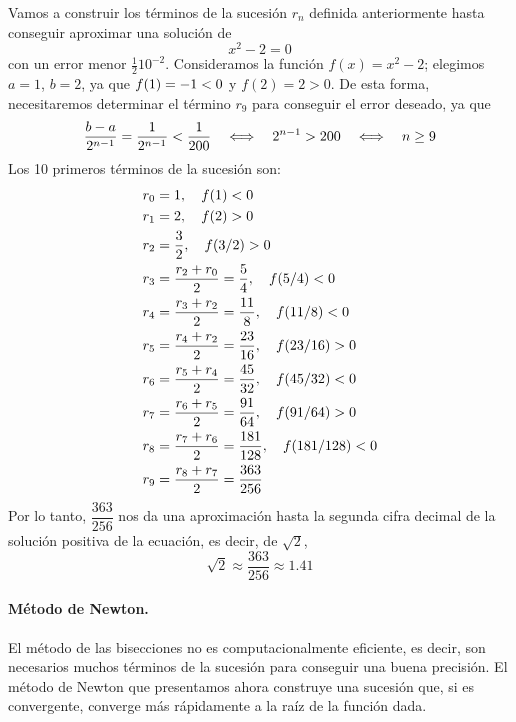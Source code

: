 \begin{ejemplo}
Vamos a construir los términos de la sucesión $r_n$ definida anteriormente hasta conseguir aproximar una solución de
\[
x^2-2=0
\]
con un error menor $\frac1210^{-2}$.
Consideramos la función $f(x)=x^2-2$; elegimos $a=1$, $b=2$, ya que $f(1)=-1< 0$ y $f(2)=2>0$.
De esta forma, necesitaremos determinar el término $r_9$ para conseguir el error deseado, ya que
\[
\dfrac{b-a}{2^{n-1}}=\dfrac1{2^{n-1}}< \frac1{200}\quad \Longleftrightarrow \quad
2^{n-1}>200\quad \Longleftrightarrow \quad n\ge9
\]
Los 10 primeros términos de la sucesión son:
\begin{align*}
r_0 & =1,\quad f(1)< 0 \\
r_1 & =2,\quad f(2)>0 \\
r_2 & =\frac32,\quad f(3/2) >0 \\
r_3 & =\frac{r_2+r_0}2=\frac54,\quad f(5/4)< 0 \\
r_4 & =\frac{r_3+r_2}2=\frac{11}8,\quad f(11/8)< 0 \\
r_5 & =\frac{r_4+r_2}2=\frac{23}{16},\quad f(23/16)>0 \\
r_6 & =\frac{r_5+r_4}2=\frac{45}{32},\quad f(45/32)< 0 \\
r_7 & =\frac{r_6+r_5}2=\frac{91}{64},\quad f(91/64)>0 \\
r_8 & =\frac{r_7+r_6}2=\frac{181}{128},\quad f(181/128)< 0 \\
r_9 & =\frac{r_8+r_7}2=\frac{363}{256}
\end{align*}
%
Por lo tanto, $\dfrac{363}{256}$ nos da una aproximación hasta la segunda cifra decimal de la solución positiva de la ecuación, es decir, de $\sqrt2$,
\[
\sqrt2\approx \dfrac{363}{256}\approx 1.41\tag*{\fej}
\]
\end{ejemplo}

\paragraph{Método de Newton.} El método de las bisecciones no es computacionalmente eficiente, es decir, son necesarios muchos términos de la sucesión para conseguir una buena precisión.
El método de Newton que presentamos ahora construye una sucesión que, si es convergente, converge más rápidamente a la raíz de la función dada.

